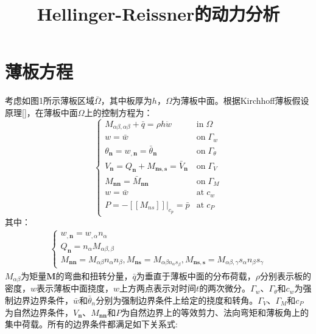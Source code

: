 \documentclass[a4paper]{article}
\begin{document}
\title{Hellinger-Reissner的动力分析}
\maketitle
\section{薄板方程}
考虑如图1所示薄板区域$\bar \Omega$，其中板厚为$h$，$\Omega$为薄板中面。根据Kirchhoff薄板假设原理[]，在薄板中面$\Omega$上的控制方程为：
\begin{equation}
    \begin{cases}
        M_{\alpha\beta,\alpha\beta}+\bar q=\rho h \ddot{w}&\mathrm{in} \; \Omega\\
        w=\bar w&\mathrm{on}\;\Gamma_w\\
        \theta_{\boldsymbol n}=w_{,\pmb n}=\bar \theta_{\boldsymbol n}&\mathrm{on}\;\Gamma_{\theta}\\
        V_{\pmb n}=Q_{\pmb n}+M_{\pmb{ns},\pmb s}=\bar V_{\pmb n}&\mathrm{on}\;\Gamma_V\\
        M_{\pmb{nn}}=\bar M_{\pmb{nn}}&\mathrm{on}\; \Gamma_M\\
        w=\bar w&\mathrm{at} \; c_w\\
        P=-[[M_{ns}]]\vert_{c_p}=\bar p&\mathrm{at}\; c_P
    \end{cases}
\end{equation}
其中：
\begin{equation}
\begin{split}
    \begin{cases}
    w_{,\pmb n}=w_{,\alpha}n_{\alpha}\\
Q_{\pmb n}=n_{\alpha}M_{\alpha\beta,\beta}\\
M_{\pmb{nn}}=M_{\alpha\beta}n_{\alpha}n_{\beta},M_{\pmb{ns}}=M_{\alpha\beta n_{\alpha}s_{\beta}},M_{\pmb{ns,s}}=M_{\alpha\beta,\gamma}s_{\alpha}n_{\beta}s_{\gamma}
    \end{cases}
\end{split}
\end{equation}
$M_{\alpha\beta}$为矩量$\boldsymbol M$的弯曲和扭转分量，$\bar q$为垂直于薄板中面的分布荷载，$\rho$分别表示板的密度，$w$表示薄板中面挠度，$w$上方两点表示对时间$t$的两次微分。$\Gamma_w$、$\Gamma_{\theta}$和$c_w$为强制边界边界条件，$\bar w$和$\bar \theta_n$分别为强制边界条件上给定的挠度和转角。$\Gamma_V$、$\Gamma_M$和$c_P$为自然边界条件，$V_{\boldsymbol n}$、$M_{\boldsymbol{nn}}$和$P$为自然边界上的等效剪力、法向弯矩和薄板角上的集中荷载。所有的边界条件都满足如下关系式:
\end{document}
